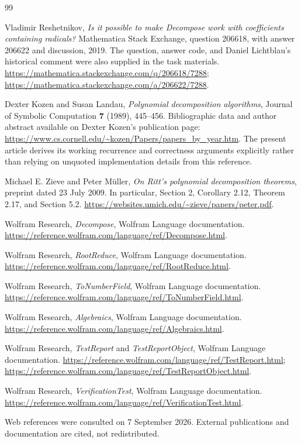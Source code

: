 \documentclass[11pt,letterpaper]{article}
\theoremstyle{definition}
\theoremstyle{remark}
\begin{document}
\begin{thebibliography}{99}

Vladimir Reshetnikov, \emph{Is it possible to make Decompose work with
coefficients containing radicals?} Mathematica Stack Exchange,
question 206618, with answer 206622 and discussion, 2019.
The question, answer code, and Daniel Lichtblau's historical comment were
also supplied in the task materials.
\url{https://mathematica.stackexchange.com/q/206618/7288};
\url{https://mathematica.stackexchange.com/a/206622/7288}.

Dexter Kozen and Susan Landau, \emph{Polynomial decomposition algorithms},
Journal of Symbolic Computation \textbf{7} (1989), 445--456.
Bibliographic data and author abstract available on Dexter Kozen's
publication page:
\url{https://www.cs.cornell.edu/~kozen/Papers/papers_by_year.htm}.
The present article derives its working recurrence and correctness
arguments explicitly rather than relying on unquoted implementation
details from this reference.

Michael E. Zieve and Peter M\"uller, \emph{On Ritt's polynomial decomposition
theorems}, preprint dated 23 July 2009. In particular, Section 2,
Corollary 2.12, Theorem 2.17, and Section 5.2.
\url{https://websites.umich.edu/~zieve/papers/peter.pdf}.

Wolfram Research, \emph{Decompose}, Wolfram Language documentation.
\url{https://reference.wolfram.com/language/ref/Decompose.html}.

Wolfram Research, \emph{RootReduce}, Wolfram Language documentation.
\url{https://reference.wolfram.com/language/ref/RootReduce.html}.

Wolfram Research, \emph{ToNumberField}, Wolfram Language documentation.
\url{https://reference.wolfram.com/language/ref/ToNumberField.html}.

Wolfram Research, \emph{Algebraics}, Wolfram Language documentation.
\url{https://reference.wolfram.com/language/ref/Algebraics.html}.

Wolfram Research, \emph{TestReport} and \emph{TestReportObject},
Wolfram Language documentation.
\url{https://reference.wolfram.com/language/ref/TestReport.html};
\url{https://reference.wolfram.com/language/ref/TestReportObject.html}.

Wolfram Research, \emph{VerificationTest}, Wolfram Language documentation.
\url{https://reference.wolfram.com/language/ref/VerificationTest.html}.

\end{thebibliography}
\noindent\small Web references were consulted on 7 September 2026.
External publications and documentation are cited, not redistributed.
\end{document}
